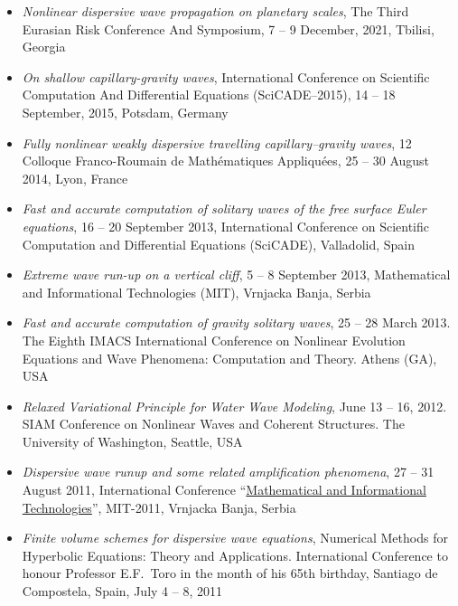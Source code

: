 \documentclass[final, a4paper, oneside, 12pt]{article}
\numberwithin{equation}{section}
\begin{document}
\begin{itemize}

  \item \textit{Nonlinear dispersive wave propagation on planetary scales}, The Third Eurasian Risk Conference And Symposium, 7 -- 9 December, 2021, Tbilisi, Georgia

  \item \textit{On shallow capillary-gravity waves}, International Conference on Scientific Computation And Differential Equations (SciCADE--2015), 14 -- 18 September, 2015, Potsdam, Germany

  \item \textit{Fully nonlinear weakly dispersive travelling capillary--gravity waves},  12 Colloque Franco-Roumain de Math\'ematiques Appliqu\'ees, 25 -- 30 August 2014, Lyon, France

  \item \textit{Fast and accurate computation of solitary waves of the free surface Euler equations}, 16 -- 20 September 2013, International Conference on Scientific Computation and Differential Equations (SciCADE), Valladolid, Spain

  \item \textit{Extreme wave run-up on a vertical cliff}, 5 -- 8 September 2013, Mathematical and Informational Technologies (MIT), Vrnjacka Banja, Serbia

  \item \textit{Fast and accurate computation of gravity solitary waves}, 25 -- 28 March 2013. The Eighth IMACS International Conference on Nonlinear Evolution Equations and Wave Phenomena: Computation and Theory. Athens (GA), USA

  \item \textit{Relaxed Variational Principle for Water Wave Modeling}, June 13 -- 16, 2012. SIAM Conference on Nonlinear Waves and Coherent Structures. The University of Washington, Seattle, USA

  \item \textit{Dispersive wave runup and some related amplification phenomena}, 27 -- 31 August 2011, International Conference ``\href{http://mit.rs/2011/index.html}{Mathematical and Informational Technologies}'', MIT-2011, Vrnjacka Banja, Serbia
  
  \item \textit{Finite volume schemes for dispersive wave equations}, Numerical Methods for Hyperbolic Equations: Theory and Applications. International Conference to honour Professor E.F.~Toro in the month of his 65th birthday, Santiago de Compostela, Spain, July 4 -- 8, 2011
  

\end{itemize}
\end{document}
